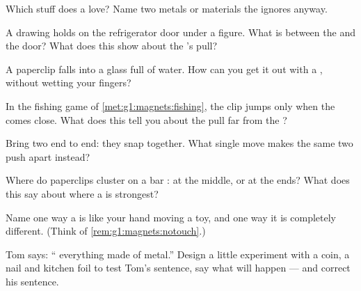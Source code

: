 \begin{exercise}[$\star$]\label{exo:g1:magnets:2}
Which stuff does a  love? Name two metals or materials the
 ignores anyway.
\end{exercise}

\begin{exercise}[$\star$]\label{exo:g1:magnets:3}
A drawing holds on the refrigerator door under a  figure. What
is between the  and the door? What does this show about the
's pull?
\end{exercise}

\begin{exercise}[$\star$]\label{exo:g1:magnets:4}
A paperclip falls into a glass full of water. How can you get it out
with a , without wetting your fingers?
\end{exercise}

\begin{exercise}[$\star$]\label{exo:g1:magnets:5}
In the  fishing game of \cref{met:g1:magnets:fishing}, the clip
jumps only when the  comes close. What does this tell you about
the pull far from the ?
\end{exercise}

\begin{exercise}[$\star$]\label{exo:g1:magnets:6}
Bring two  end to end: they snap together. What single move
makes the same two  push apart instead?
\end{exercise}

\begin{exercise}[$\star$]\label{exo:g1:magnets:7}
Where do paperclips cluster on a bar : at the middle, or at
the ends? What does this say about where a  is strongest?
\end{exercise}

\begin{exercise}[$\star$]\label{exo:g1:magnets:8}
Name one way a  is like your hand moving a toy, and one way it
is completely different. (Think of
\cref{rem:g1:magnets:notouch}.)
\end{exercise}

\begin{exercise}[$\star\star$]\label{exo:g1:magnets:9}
Tom says: ``  everything made of metal.'' Design a
little experiment with a coin, a nail and kitchen foil to test Tom's
sentence, say what will happen --- and correct his sentence.
\end{exercise}
